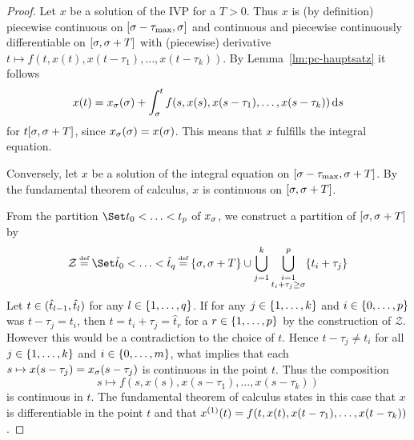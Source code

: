     \begin{proof}
        Let $x$ be a solution of the IVP for a $T>0$. Thus $x$ is (by definition) piecewise continuous on $\compactum{\tzero-\taumax}{\tzero}$ and continuous and piecewise continuously differentiable on $\compactum{\tzero}{\tzero+T}$ with (piecewise) derivative $t\mapsto f(t,x(t),x(t-\tau_1),\ldots,x(t-\tau_k))$.
        By Lemma~\ref{lm:pc-hauptsatz} it follows
        \begin{equation*}
            x(t) = x_{\tzero}(\tzero) + \integral{\tzero}{t} f(s,x(s),x(s-\tau_1),\ldots,x(s-\tau_k))\dx[s]
        \end{equation*}
        for $t\compactum{\tzero}{\tzero+T}$, since $x_{\tzero}(\tzero)=x(\tzero)$. This means that $x$ fulfills the integral equation.

        Conversely, let $x$ be a solution of the integral equation on $\compactum{\tzero-\taumax}{\tzero+T}$.
        By the fundamental theorem of calculus, $x$ is continuous on $\compactum{\tzero}{\tzero+T}$.

        From the partition $\partition{t_0}{t_p}$ of $x_{\tzero}$, we construct a partition of $\compactum{\tzero}{\tzero+T}$ by
        \begin{equation}\label{eq:partition}
            \mathcal{Z}\defeq \partition{\hat{t}_0}{\hat{t}_q}
            \defeq \set{\tzero,\tzero+T}\cup\bigcup_{j=1}^{k}\bigcup_{\substack{i=1\\t_i+\tau_j\geq\tzero}}^{p}\set{t_i+\tau_j}
        \end{equation}
        Let $t\in\open{\hat{t}_{l-1}}{\hat{t}_l}$ for any $l\in\set{\range{1}{q}}$. If for any $j\in\set{\range{1}{k}}$ and $i\in\set{\range{0}{p}}$ was $t-\tau_j = t_i$, then $t=t_i+\tau_j=\hat{t}_r$ for a $r\in\set{\range{1}{p}}$ by the construction of $\mathcal{Z}$. However this would be a contradiction to the choice of $t$. Hence $t-\tau_j \neq t_i$ for all $j\in\set{\range{1}{k}}$ and $i\in\set{\range{0}{m}}$, what implies that each $s\mapsto x(s-\tau_j)=x_{\tzero}(s-\tau_j)$ is continuous in the point $t$. Thus the composition
        \begin{equation*}
            s\mapsto f(s,x(s),x(s-\tau_1),\ldots,x(s-\tau_k))
        \end{equation*}
        is continuous in $t$. The fundamental theorem of calculus states in this case that $x$ is differentiable in the point $t$ and that $\D{x}(t)=f(t,x(t),x(t-\tau_1),\ldots,x(t-\tau_k))$.


\end{proof}
